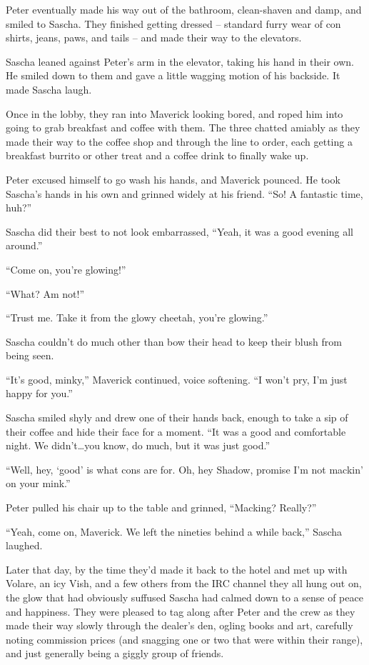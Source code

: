 Peter eventually made his way out of the bathroom, clean-shaven and damp, and smiled to Sascha. They finished getting dressed -- standard furry wear of con shirts, jeans, paws, and tails -- and made their way to the elevators.

Sascha leaned against Peter's arm in the elevator, taking his hand in their own. He smiled down to them and gave a little wagging motion of his backside. It made Sascha laugh.

Once in the lobby, they ran into Maverick looking bored, and roped him into going to grab breakfast and coffee with them. The three chatted amiably as they made their way to the coffee shop and through the line to order, each getting a breakfast burrito or other treat and a coffee drink to finally wake up.

Peter excused himself to go wash his hands, and Maverick pounced. He took Sascha's hands in his own and grinned widely at his friend. ``So! A fantastic time, huh?''

Sascha did their best to not look embarrassed, ``Yeah, it was a good evening all around.''

``Come on, you're glowing!''

``What? Am not!''

``Trust me. Take it from the glowy cheetah, you're glowing.''

Sascha couldn't do much other than bow their head to keep their blush from being seen.

``It's good, minky,'' Maverick continued, voice softening. ``I won't pry, I'm just happy for you.''

Sascha smiled shyly and drew one of their hands back, enough to take a sip of their coffee and hide their face for a moment. ``It was a good and comfortable night. We didn't\ldots{}you know, do much, but it was just good.''

``Well, hey, `good' is what cons are for. Oh, hey Shadow, promise I'm not mackin' on your mink.''

Peter pulled his chair up to the table and grinned, ``Macking? Really?''

``Yeah, come on, Maverick. We left the nineties behind a while back,'' Sascha laughed.

Later that day, by the time they'd made it back to the hotel and met up with Volare, an icy Vish, and a few others from the IRC channel they all hung out on, the glow that had obviously suffused Sascha had calmed down to a sense of peace and happiness. They were pleased to tag along after Peter and the crew as they made their way slowly through the dealer's den, ogling books and art, carefully noting commission prices (and snagging one or two that were within their range), and just generally being a giggly group of friends.

